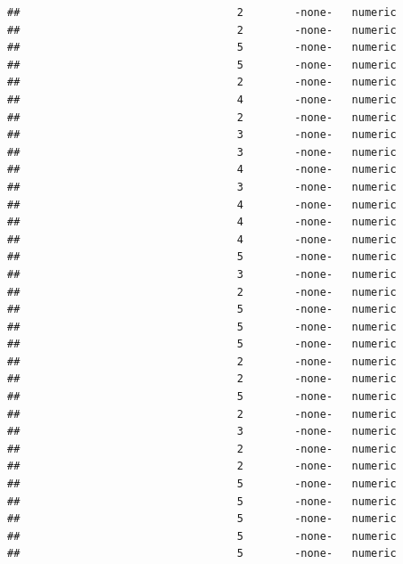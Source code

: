 \documentclass[
  12pt,
]{article}
\begin{document}
\begin{verbatim}
##                                  2        -none-   numeric                    
##                                  2        -none-   numeric                    
##                                  5        -none-   numeric                    
##                                  5        -none-   numeric                    
##                                  2        -none-   numeric                    
##                                  4        -none-   numeric                    
##                                  2        -none-   numeric                    
##                                  3        -none-   numeric                    
##                                  3        -none-   numeric                    
##                                  4        -none-   numeric                    
##                                  3        -none-   numeric                    
##                                  4        -none-   numeric                    
##                                  4        -none-   numeric                    
##                                  4        -none-   numeric                    
##                                  5        -none-   numeric                    
##                                  3        -none-   numeric                    
##                                  2        -none-   numeric                    
##                                  5        -none-   numeric                    
##                                  5        -none-   numeric                    
##                                  5        -none-   numeric                    
##                                  2        -none-   numeric                    
##                                  2        -none-   numeric                    
##                                  5        -none-   numeric                    
##                                  2        -none-   numeric                    
##                                  3        -none-   numeric                    
##                                  2        -none-   numeric                    
##                                  2        -none-   numeric                    
##                                  5        -none-   numeric                    
##                                  5        -none-   numeric                    
##                                  5        -none-   numeric                    
##                                  5        -none-   numeric                    
##                                  5        -none-   numeric                    

\end{verbatim}
\end{document}
